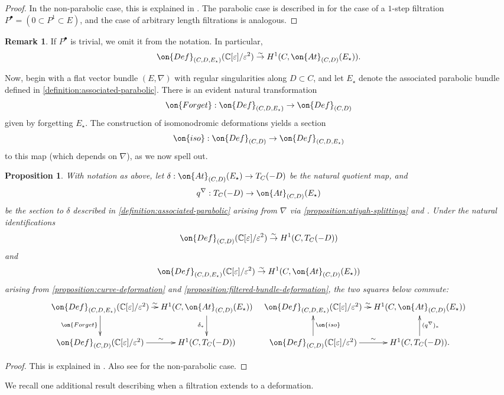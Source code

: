 \documentclass[12 pt]{amsart}
\theoremstyle{plain}
\newtheorem{proposition}[subsubsection]{Proposition}
\theoremstyle{definition}
\newtheorem{remark}[subsubsection]{Remark}
\theoremstyle{remark}
\numberwithin{equation}{section}
\begin{document}
\begin{proof}
	In the non-parabolic case, this is explained in \cite[\S2.2]{BHH:logarithmic}.
	The parabolic case is described in \cite[Lemma 3.2]{BHH:parabolic} for
	the case of a $1$-step filtration $P^\bullet = (0 \subset P^1 \subset
	E)$, and the case of arbitrary length filtrations is analogous.
\end{proof}
\begin{remark}
	\label{remark:}
	If $P^\bullet$ is trivial, we omit it from the notation. In particular,
	$$\on{Def}_{(C, D,
	E_\star)}(\mathbb{C}[\varepsilon]/\varepsilon^2)\overset{\sim}{\to} H^1(C,
	\on{At}_{(C,D)}(E_\star)).$$
\end{remark}

Now, begin with a flat vector bundle $(E, \nabla)$ with regular singularities
along $D \subset C$, and let $E_\star$ denote the associated parabolic bundle defined in
\autoref{definition:associated-parabolic}.
There is an evident natural transformation $$\on{Forget}: \on{Def}_{(C, D,
{E_\star})}\to \on{Def}_{(C,D)}$$ given by forgetting ${E_\star}$. The construction of
isomonodromic deformations yields a section $$\on{iso}: \on{Def}_{(C,D)}\to
\on{Def}_{(C,D,E_\star)}$$ to this map (which depends on $\nabla$), as we now spell
out.

\begin{proposition}
	\label{proposition:connection-h1}
	With notation as above, let $\delta: \on{At}_{(C,D)}(E_\star)\to T_C(-D)$ be the natural quotient map, and
$$q^\nabla: T_C(-D)\to\on{At}_{(C,D)}({E_\star})$$ be the section to $\delta$ 
described in \autoref{definition:associated-parabolic}
arising
from $\nabla$ via \autoref{proposition:atiyah-splittings} and
\cite[Lemma 4.1]{BHH:parabolic}.
    Under the natural identifications
    $$\on{Def}_{(C,D)}(\mathbb{C}[\varepsilon]/\varepsilon^2)\overset{\sim}{\to}
    H^1(C, T_C(-D))$$ and $$\on{Def}_{(C,D,
    {E_\star})}(\mathbb{C}[\varepsilon]/\varepsilon^2)\overset{\sim}{\to} H^1(C,
    \on{At}_{(C,D)}({E_\star}))$$
    arising from \autoref{proposition:curve-deformation} and \autoref{proposition:filtered-bundle-deformation}, the two squares below commute:
    $$\xymatrix@C=.8em{
    \on{Def}_{(C,D, {E_\star})}(\mathbb{C}[\varepsilon]/\varepsilon^2) \ar[r]^-\sim
    \ar[d]_{\on{Forget}}&  H^1(C, \on{At}_{(C,D)}({E_\star})) \ar[d]_{\delta_*} &
    \on{Def}_{(C,D, {E_\star})}(\mathbb{C}[\varepsilon]/\varepsilon^2) \ar[r]^-\sim &
    H^1(C, \on{At}_{(C,D)}({E_\star})) \\
    \on{Def}_{(C,D)}(\mathbb{C}[\varepsilon]/\varepsilon^2) \ar[r]^-\sim & H^1(C,
    T_C(-D))  & \on{Def}_{(C,D)}(\mathbb{C}[\varepsilon]/\varepsilon^2) \ar[r]^-\sim
    \ar[u]_{\on{iso}} & H^1(C, T_C(-D)) \ar[u]_{(q^\nabla)_*}.
    }$$
   \end{proposition}
\begin{proof}
	This is explained in \cite[Lemma 3.1 and Lemma 4.3]{BHH:parabolic}.
	Also see \cite[\S2.2 and \S 4.1]{BHH:logarithmic} for the non-parabolic
	case.
\end{proof}
We recall one additional result describing when a filtration extends to a
deformation.
\end{document}
